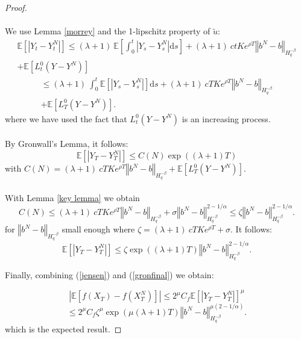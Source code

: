 \documentclass[12pt]{article}
\newcommand{\norme}[1]{\left\Vert #1\right\Vert}
\newcommand{\E}{\mathbb{E}}
\newcommand{\di}{\mathrm{d}}
\begin{document}
\begin{proof}
    \paragraph{}
    We use Lemma \ref{morrey} and the 1-lipschitz property of $\tilde{u}$:
    \begin{multline*}
    \E\left[\left|Y_t-Y_t^N\right|\right]\leq (\lambda + 1)\ \E\left[\int_0^t\left|Y_s-Y_s^N\right| \di s\right] +(\lambda + 1)\ ctKe^{\rho T}\norme{b^N-b}_{H^{-\beta}_{q}}\\ + \E \left[L_t^0(Y-Y^N)\right]
    \end{multline*}    
    \begin{multline*}
    \leq (\lambda + 1)\ \int_0^t\E\left[\left|Y_s-Y_s^N\right|\right] \di s + (\lambda + 1)\ cTKe^{\rho T}\norme{b^N-b}_{H^{-\beta}_{q}}\\ + \E \left[L_T^0(Y-Y^N)\right].
    \end{multline*}
    where we have used the fact that $L_t^0(Y-Y^N)$ is an increasing process.    
    \paragraph{}
    By Gronwall's Lemma, it follows:
    \begin{equation}\label{gronwall}
    \E\left[\left|Y_T-Y_T^N\right|\right] \leq C(N) \exp((\lambda+1)T)
    \end{equation}
    with $C(N) = (\lambda + 1)\ cTKe^{\rho T}\norme{b^N-b}_{H^{-\beta}_{q}} + \E \left[L_T^0(Y-Y^N)\right].$      
    
    \paragraph{}
    With Lemma \ref{key lemma} we obtain \begin{equation*}
    C(N) \leq (\lambda + 1)\ cTKe^{\rho T}\norme{b^N-b}_{H^{-\beta}_{q}} + \sigma\norme{b^N-b}_{H^{-\beta}_{q}}^{2-1/\alpha} \leq \zeta \norme{b^N-b}_{H^{-\beta}_{q}}^{2-1/\alpha}.
    \end{equation*}   
    for $\norme{b^N-b}_{H^{-\beta}_{q}}$ small enough where $\zeta = (\lambda + 1)\ cTKe^{\rho T} + \sigma $. It follows:
    \begin{equation}\label{gronfinal}
    \E\left[\left|Y_T-Y_T^N\right|\right] \leq \zeta \exp((\lambda+1)T) \norme{b^N-b}_{H^{-\beta}_{q}}^{2-1/\alpha}.
    \end{equation}
    
    Finally, combining (\ref{jensen}) and (\ref{gronfinal}) we obtain:
    
    \begin{equation*}
    \left|\E\left[f\left(X_T\right)-f\left(X_T^N\right)\right]\right| \leq 2^\mu C_f  \E\left[\left|Y_T-Y_T^N\right|\right]^\mu
    \end{equation*}
    \begin{equation*}
    \leq 2^\mu C_f  \zeta^\mu \exp(\mu(\lambda+1)T) \norme{b^N-b}_{H^{-\beta}_{q}}^{\mu(2-1/\alpha)}.
    \end{equation*}    
    which is the expected result.
    
\end{proof}   
\end{document}
